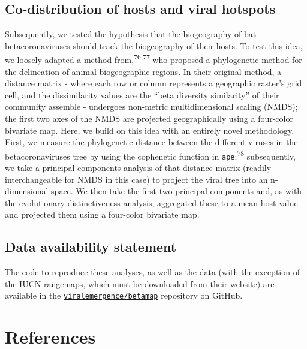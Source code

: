 \documentclass[10pt,oneside]{article}
\begin{document}
\hypertarget{co-distribution-of-hosts-and-viral-hotspots}{%
\subsection{Co-distribution of hosts and viral
hotspots}\label{co-distribution-of-hosts-and-viral-hotspots}}

Subsequently, we tested the hypothesis that the biogeography of bat
betacoronaviruses should track the biogeography of their hosts. To test
this idea, we loosely adapted a method from,\textsuperscript{76,77} who
proposed a phylogenetic method for the delineation of animal
biogeographic regions. In their original method, a distance matrix -
where each row or column represents a geographic raster's grid cell, and
the dissimilarity values are the ``beta diversity similarity'' of their
community assemble - undergoes non-metric multidimensional scaling
(NMDS); the first two axes of the NMDS are projected geographically
using a four-color bivariate map. Here, we build on this idea with an
entirely novel methodology. First, we measure the phylogenetic distance
between the different viruses in the betacoronaviruses tree by using the
cophenetic function in \texttt{ape};\textsuperscript{78} subsequently,
we take a principal components analysis of that distance matrix (readily
interchangeable for NMDS in this case) to project the viral tree into an
n-dimensional space. We then take the first two principal components
and, as with the evolutionary distinctiveness analysis, aggregated these
to a mean host value and projected them using a four-color bivariate
map.

\hypertarget{data-availability-statement}{%
\subsection{Data availability
statement}\label{data-availability-statement}}

The code to reproduce these analyses, as well as the data (with the
exception of the IUCN rangemaps, which must be downloaded from their
website) are available in the
\href{https://github.com/viralemergence/betamap}{\texttt{viralemergence/betamap}}
repository on GitHub.

\newpage

\hypertarget{references}{%
\section*{References}\label{references}}
\end{document}
